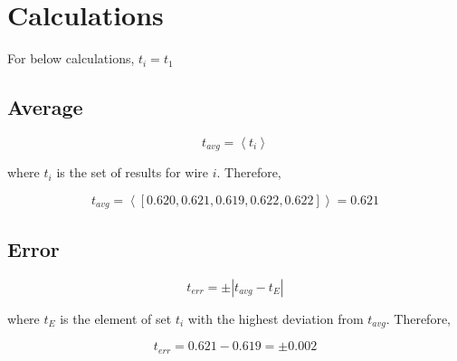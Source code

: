 \documentclass[a4paper]{article}
\def\mean#1{\left< #1 \right>}
\def\abs#1{\left| #1 \right|}
\numberwithin{equation}{subsection}
\begin{document}
        \section{Calculations}
            \centerline{For below calculations, \(t_{i}=t_{1}\)}
            \subsection{Average}
                \begin{equation} \label{eq:avg}
                    t_{avg}=\mean{t_{i}}
                \end{equation}
                \centerline{where \(t_{i}\) is the set of results for wire \(i\).
                Therefore,}
                \begin{equation}
                    t_{avg}=\mean{[0.620,0.621,0.619,0.622,0.622]}=0.621
                \end{equation}

            \subsection{Error}
                \begin{equation} \label{eq:err}
                    t_{err}=\pm\abs{t_{avg}-t_{E}}
                \end{equation}
                \centerline{where \(t_{E}\) is the element of set \(t_{i}\) with
                the highest deviation from \(t_{avg}\). Therefore,}
                \begin{equation}
                    t_{err}=0.621-0.619=\pm0.002
                \end{equation}
\end{document}
